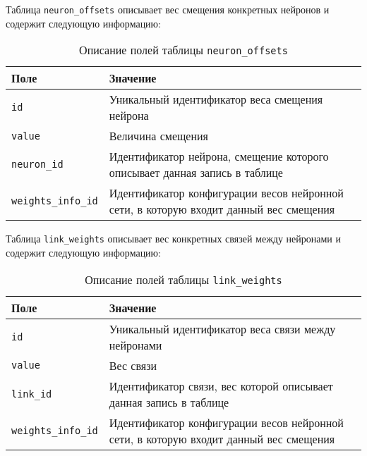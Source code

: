 Таблица \texttt{neuron\_offsets} описывает вес смещения конкретных нейронов и содержит следующую информацию:

\begin{table}[!ht]
    \label{tbl:neuronoff}
    \caption{Описание полей таблицы \texttt{neuron\_offsets}}
    \begin{center}
        \begin{tabular}{|p{}|p{}|}
            \hline
            \textbf{Поле} & \textbf{Значение} \\\hline
            \texttt{id} & Уникальный идентификатор веса смещения нейрона \\\hline
            \texttt{value} & Величина смещения \\\hline
            \texttt{neuron\_id} & Идентификатор нейрона, смещение которого описывает данная запись в таблице \\\hline
            \texttt{weights\_info\_id} & Идентификатор конфигурации весов нейронной сети, в которую входит данный вес смещения\\\hline
        \end{tabular}
    \end{center}
\end{table}

Таблица \texttt{link\_weights} описывает вес конкретных связей между нейронами и содержит следующую информацию:

\begin{table}[!ht]
    \label{tbl:neuronweights}
    \caption{Описание полей таблицы  \texttt{link\_weights}}
    \begin{center}
        \begin{tabular}{|p{}|p{}|}
            \hline
            \textbf{Поле} & \textbf{Значение} \\\hline
            \texttt{id} & Уникальный идентификатор веса связи между нейронами \\\hline
            \texttt{value} & Вес связи \\\hline
            \texttt{link\_id} & Идентификатор связи, вес которой описывает данная запись в таблице \\\hline
            \texttt{weights\_info\_id} & Идентификатор конфигурации весов нейронной сети, в которую входит данный вес смещения\\\hline
        \end{tabular}
    \end{center}
\end{table}

